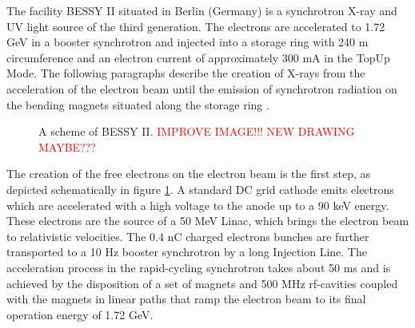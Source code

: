 The facility BESSY II situated in Berlin (Germany) is a synchrotron X-ray and UV light source of the third generation. The electrons are accelerated to 1.72 GeV in a booster synchrotron and injected into a storage ring with 240 m circumference and an electron current of approximately 300 mA in the TopUp Mode\citep{couprie_x_2008}. The following paragraphs describe the creation of X-rays from the acceleration of the electron beam until the emission of synchrotron radiation on the bending magnets situated along the storage ring \citep{bakker_orbit_1998, bakker_status_1999}.

\begin{figure}%
	\centering
		\caption{A scheme of BESSY II. \textcolor{red}{IMPROVE IMAGE!!! NEW DRAWING MAYBE???}}
		\label{fig:BessyScheme}
\end{figure}


The creation of the free electrons on the electron beam is the first step, as depicted schematically in figure \ref{fig:BessyScheme}. A standard DC grid cathode emits electrons which are accelerated with a high voltage to the anode up to a 90 keV energy. These electrons are the source of a 50 MeV Linac, which brings the electron beam to relativistic velocities. The 0.4 nC charged electrons bunches are further transported to a 10 Hz booster synchrotron by a long Injection Line. The acceleration process in the rapid-cycling synchrotron takes about 50 ms and is achieved by the disposition of a set of magnets and 500 MHz rf-cavities coupled with the magnets in linear paths that ramp the electron beam to its final operation energy of 1.72 GeV.

